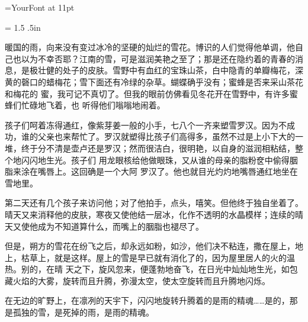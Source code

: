 
\font\a=YourFont at 11pt\a

\baselineskip = 1.5\baselineskip %
\topskip .5in
\narrower\narrower

暖国的雨，向来没有变过冰冷的坚硬的灿烂的雪花。博识的人们觉得他单调，他自己也以为不幸否耶？江南的雪，可是滋润美艳之至了；那是还在隐约着的青春的消息，是极壮健的处子的皮肤。雪野中有血红的宝珠山茶，白中隐青的单瓣梅花，深黄的磬口的蜡梅花；雪下面还有冷绿的杂草。蝴蝶确乎没有；蜜蜂是否来采山茶花和梅花的 蜜，我可记不真切了。但我的眼前仿佛看见冬花开在雪野中，有许多蜜蜂们忙碌地飞着，也 听得他们嗡嗡地闹着。

孩子们呵着冻得通红，像紫芽姜一般的小手，七八个一齐来塑雪罗汉。因为不成功，谁的父亲也来帮忙了。罗汉就塑得比孩子们高得多，虽然不过是上小下大的一堆，终于分不清是壶卢还是罗汉；然而很洁白，很明艳，以自身的滋润相粘结，整个地闪闪地生光。孩子们 用龙眼核给他做眼珠，又从谁的母亲的脂粉奁中偷得胭脂来涂在嘴唇上。这回确是一个大阿 罗汉了。他也就目光灼灼地嘴唇通红地坐在雪地里。

第二天还有几个孩子来访问他；对了他拍手，点头，嘻笑。但他终于独自坐着了。晴天又来消释他的皮肤，寒夜又使他结一层冰，化作不透明的水晶模样；连续的晴天又使他成为不知道算什么，而嘴上的胭脂也褪尽了。

但是，朔方的雪花在纷飞之后，却永远如粉，如沙，他们决不粘连，撒在屋上，地上，枯草上，就是这样。屋上的雪是早已就有消化了的，因为屋里居人的火的温热。别的，在晴 天之下，旋风忽来，便蓬勃地奋飞，在日光中灿灿地生光，如包藏火焰的大雾，旋转而且升腾，弥漫太空，使太空旋转而且升腾地闪烁。
    
在无边的旷野上，在凛冽的天宇下，闪闪地旋转升腾着的是雨的精魂……是的，那是孤独的雪，是死掉的雨，是雨的精魂。 

\bye
